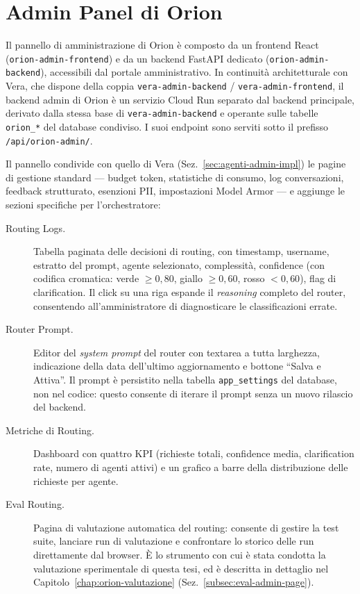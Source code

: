 \section{Admin Panel di Orion}
\label{sec:orion-impl-admin}

Il pannello di amministrazione di Orion è composto da un frontend React
(\texttt{orion-admin-frontend}) e da un backend FastAPI dedicato
(\texttt{orion-admin-backend}), accessibili dal portale amministrativo.
In continuità architetturale con Vera, che dispone della coppia
\texttt{vera-admin-backend} / \texttt{vera-admin-frontend},
il backend admin di Orion è un servizio Cloud Run separato dal backend
principale, derivato dalla stessa base di \texttt{vera-admin-backend} e
operante sulle tabelle \texttt{orion\_*} del database condiviso.
I suoi endpoint sono serviti sotto il prefisso \texttt{/api/orion-admin/}.

Il pannello condivide con quello di Vera (Sez.~\ref{sec:agenti-admin-impl})
le pagine di gestione standard --- budget token, statistiche di consumo,
log conversazioni, feedback strutturato, esenzioni PII, impostazioni Model
Armor --- e aggiunge le sezioni specifiche per l'orchestratore:

\begin{description}
  \item[Routing Logs.] Tabella paginata delle decisioni di routing, con timestamp, username, estratto del prompt,
  agente selezionato, complessità, confidence (con codifica cromatica: verde $\geq 0{,}80$, giallo $\geq 0{,}60$, rosso $< 0{,}60$), flag di clarification. Il click su una riga espande il \emph{reasoning} completo del router, consentendo all'amministratore di diagnosticare le classificazioni errate.

  \item[Router Prompt.] Editor del \emph{system prompt} del router con textarea a tutta larghezza,
  indicazione della data dell'ultimo aggiornamento e bottone ``Salva e Attiva''.
  Il prompt è persistito nella tabella \texttt{app\_settings} del database, non nel codice:
  questo consente di iterare il prompt senza un nuovo rilascio del backend.

  \item[Metriche di Routing.] Dashboard con quattro KPI (richieste totali, confidence media, clarification rate, numero di agenti attivi)
  e un grafico a barre della distribuzione delle richieste per agente.

  \item[Eval Routing.] Pagina di valutazione automatica del routing: consente
  di gestire la test suite, lanciare run di valutazione e confrontare lo
  storico delle run direttamente dal browser. È lo strumento con cui è stata
  condotta la valutazione sperimentale di questa tesi, ed è descritta in
  dettaglio nel Capitolo~\ref{chap:orion-valutazione}
  (Sez.~\ref{subsec:eval-admin-page}).
\end{description}


